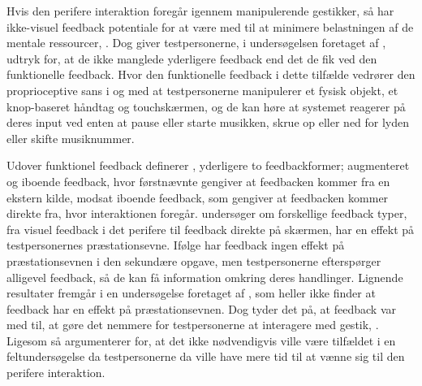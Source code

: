 Hvis den perifere interaktion foregår igennem manipulerende gestikker, så har ikke-visuel feedback potentiale for at være med til at minimere belastningen af de mentale ressourcer, \parencite[s. 3]{PDF:FacilitatingPIDesignAndEvaluation}. Dog giver testpersonerne, i undersøgelsen foretaget af \textcite[s. 173]{PDF:ComparingInputModalities}, udtryk for, at de ikke manglede yderligere feedback end det de fik ved den funktionelle feedback. Hvor den funktionelle feedback i dette tilfælde vedrører den proprioceptive sans i og med at testpersonerne manipulerer et fysisk objekt, et knop-baseret håndtag og touchskærmen, og de kan høre at systemet reagerer på deres input ved enten at pause eller starte musikken, skrue op eller ned for lyden eller skifte musiknummer.

Udover funktionel feedback definerer \textcite[s. 3]{PDF:InteractionFrogger}, yderligere to feedbackformer; augmenteret og iboende feedback, hvor førstnævnte gengiver at feedbacken kommer fra en ekstern kilde, modsat iboende feedback, som gengiver at feedbacken kommer direkte fra, hvor interaktionen foregår. \blankline
%
\textcite[ss. 1263-1268]{PDF:ComparingModFeedback} undersøger om forskellige feedback typer, fra visuel feedback i det perifere til feedback direkte på skærmen, har en effekt på testpersonernes præstationsevne. Ifølge \textcite[ss. 1267-1268]{PDF:ComparingModFeedback} har feedback ingen effekt på præstationsevnen i den sekundære opgave, men testpersonerne efterspørger alligevel feedback, så de kan få information omkring deres handlinger. Lignende resultater fremgår i en undersøgelse foretaget af \textcite[s. 8]{PDF:DoThatThere}, som heller ikke finder at feedback har en effekt på præstationsevnen. Dog tyder det på, at feedback var med til, at gøre det nemmere for testpersonerne at interagere med gestik, \parencite[s. 8]{PDF:DoThatThere}. Ligesom \textcite[s. 174]{PDF:ComparingInputModalities} så argumenterer \textcite[s. 1268]{PDF:ComparingModFeedback} for, at det ikke nødvendigvis ville være tilfældet i en feltundersøgelse da testpersonerne da ville have mere tid til at vænne sig til den perifere interaktion. 

